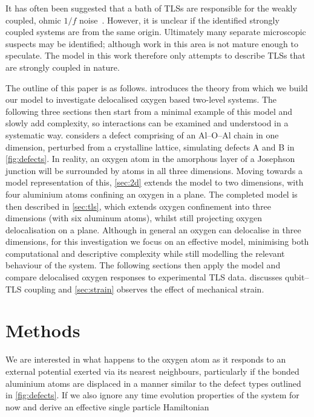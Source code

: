 It has often been suggested that a bath of TLSs are responsible for the weakly coupled, ohmic $1/f$ noise~\cite{Dutta1981}.
However, it is unclear if the identified strongly coupled systems are from the same origin.
Ultimately many separate microscopic suspects may be identified; although work in this area is not mature enough to speculate.
The model in this work therefore only attempts to describe TLSs that are strongly coupled in nature.

The outline of this paper is as follows.
 introduces the theory from which we build our model to investigate delocalised oxygen based two-level systems.
The following three sections then start from a minimal example of this model and slowly add complexity, so interactions can be examined and understood in a systematic way.
 considers a defect comprising of an Al--O--Al chain in one dimension, perturbed from a crystalline lattice, simulating defects A and B in \cref{fig:defects}.
In reality, an oxygen atom in the amorphous layer of a Josephson junction will be surrounded by atoms in all three dimensions.
Moving towards a model representation of this, \cref{sec:2d} extends the model to two dimensions, with four aluminium atoms confining an oxygen in a plane.
The completed model is then described in \cref{sec:tls}, which extends oxygen confinement into three dimensions (with six aluminum atoms), whilst still projecting oxygen delocalisation on a plane.
Although in general an oxygen can delocalise in three dimensions, for this investigation we focus on an effective  model, minimising both computational and descriptive complexity while still modelling the relevant behaviour of the system.
The following sections then apply the  model and compare delocalised oxygen responses to experimental TLS data.
 discusses qubit--TLS coupling and \cref{sec:strain} observes the effect of mechanical strain.

\section{Methods}\label{sec:methods}

We are interested in what happens to the oxygen atom as it responds to an external potential exerted via its nearest neighbours, particularly if the bonded aluminium atoms are displaced in a manner similar to the defect types outlined in \cref{fig:defects}.
If we also ignore any time evolution properties of the system for now and derive an effective single particle Hamiltonian

